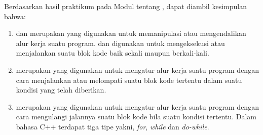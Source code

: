 \documentclass[../main.tex]{subfiles}
\begin{document}
    Berdasarkan hasil praktikum pada Modul {} tentang {\leftmark}, dapat diambil kesimpulan bahwa:
    \begin{enumerate}
        \item {
            {\Statement} {\control} dan {\looping} merupakan {\statement} yang digunakan untuk memanipulasi atau mengendalikan alur kerja suatu program. {\Statement} {\control} dan {\looping} digunakan untuk mengeksekusi atau menjalankan suatu blok kode baik sekali maupun berkali-kali.
        }
        \item {
            {\Statement} {\control} merupakan {\statement} yang digunakan untuk mengatur alur kerja suatu program dengan cara menjalankan atau melompati suatu blok kode tertentu dalam suatu kondisi yang telah diberikan.
        }
        \item {
            {\Statement} {\looping} merupakan {\statement} yang digunakan untuk mengatur alur kerja suatu program dengan cara mengulangi jalannya suatu blok kode bila suatu kondisi tertentu. Dalam bahasa C++ terdapat tiga tipe {\statement} {\looping} yakni, \textit{for}, \textit{while} dan \textit{do-while}.
        }
    \end{enumerate}
\end{document}
